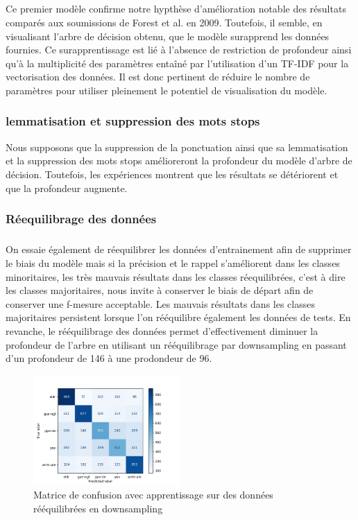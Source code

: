 \documentclass[11pt]{article}
\begin{document}
\subparagraph{}
Ce premier modèle confirme notre hypthèse d'amélioration notable des résultats comparés aux soumissions de Forest et al. en 2009. Toutefois, il semble, en visualisant l'arbre de décision obtenu, que le modèle surapprend les données fournies. Ce surapprentissage est lié à l'absence de restriction de profondeur ainsi qu'à la multiplicité des paramètres entaîné par l'utilisation d'un TF-IDF pour la vectorisation des données. Il est donc pertinent de réduire le nombre de paramètres pour utiliser pleinement le potentiel de visualisation du modèle.
\subsubsection{lemmatisation et suppression des mots stops}
Nous supposons que la suppression de la ponctuation ainsi que sa lemmatisation et la suppression des mots stops amélioreront la profondeur du modèle d'arbre de décision. Toutefois, les expériences montrent que les résultats se détériorent et que la profondeur augmente. 
\subsubsection{Réequilibrage des données}
\subparagraph{}
On essaie également de réequilibrer les données d'entrainement afin de supprimer le biais du modèle mais si la précision et le rappel s'améliorent dans les classes minoritaires, les très mauvais résultats dans les classes réequilibrées, c'est à dire les classes majoritaires, nous invite à conserver le biais de départ afin de conserver une f-mesure acceptable. Les mauvais résultats dans les classes majoritaires persistent lorsque l'on rééquilibre également les données de tests. En revanche, le rééquilibrage des données permet d'effectivement diminuer la profondeur de l'arbre en utilisant un rééquilibrage par downsampling en passant d'un profondeur de 146 à une prodondeur de 96.

\begin{figure}[h]
\includegraphics[width=0.5\textwidth]{matriceConfusionTreeBalanced}
\caption{Matrice de confusion avec apprentissage sur des données rééquilibrées en downsampling}
\centering
\end{figure}
\end{document}
